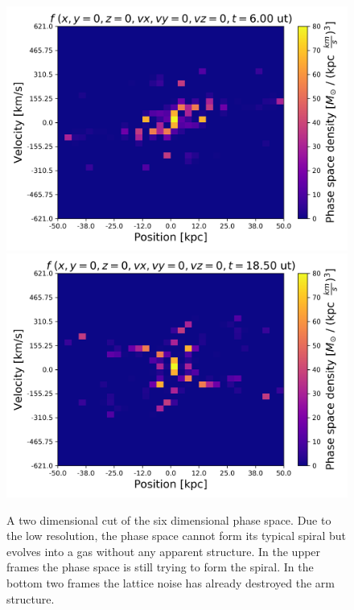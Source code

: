 {\begin{figure}[h!]
    \includegraphics[scale=0.4]{imag/3dPhase12.png}
    \includegraphics[scale=0.4]{imag/3dPhase37.png}
    \caption{A two dimensional cut of the six dimensional phase space. Due to the low resolution, the phase space cannot form its typical spiral but evolves into a gas without any apparent structure. In the upper frames the phase space is still trying to form the spiral. In the bottom two frames the lattice noise has already destroyed the arm structure. }
    \label{3dPhase}
\end{figure}



}

